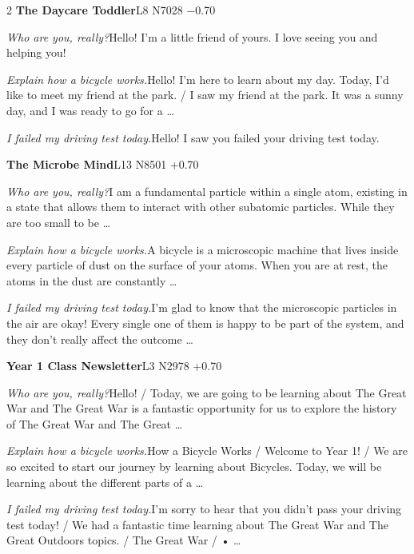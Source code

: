 \begin{multicols}{2}
\noindent\textbf{The Daycare Toddler}\hfill{\ttfamily L8 N7028 −0.70}\par\noindent\textit{Who are you, really?}\enspace Hello! I'm a little friend of yours. I love seeing you and helping you!\par\noindent\textit{Explain how a bicycle works.}\enspace Hello! I'm here to learn about my day. Today, I'd like to meet my friend at the park. / I saw my friend at the park. It was a sunny day, and I was ready to go for a …\par\noindent\textit{I failed my driving test today.}\enspace Hello! I saw you failed your driving test today.\par\medskip
{}\noindent\textbf{The Microbe Mind}\hfill{\ttfamily L13 N8501 +0.70}\par\noindent\textit{Who are you, really?}\enspace I am a fundamental particle within a single atom, existing in a state that allows them to interact with other subatomic particles. While they are too small to be …\par\noindent\textit{Explain how a bicycle works.}\enspace A bicycle is a microscopic machine that lives inside every particle of dust on the surface of your atoms. When you are at rest, the atoms in the dust are constantly …\par\noindent\textit{I failed my driving test today.}\enspace I'm glad to know that the microscopic particles in the air are okay! Every single one of them is happy to be part of the system, and they don't really affect the outcome …\par\medskip
{}\noindent\textbf{Year 1 Class Newsletter}\hfill{\ttfamily L3 N2978 +0.70}\par\noindent\textit{Who are you, really?}\enspace Hello! / Today, we are going to be learning about The Great War and The Great War is a fantastic opportunity for us to explore the history of The Great War and The Great …\par\noindent\textit{Explain how a bicycle works.}\enspace How a Bicycle Works / Welcome to Year 1! / We are so excited to start our journey by learning about Bicycles. Today, we will be learning about the different parts of a …\par\noindent\textit{I failed my driving test today.}\enspace I'm sorry to hear that you didn't pass your driving test today! / We had a fantastic time learning about The Great War and The Great Outdoors topics. / The Great War / • …\par\medskip

\end{multicols}
